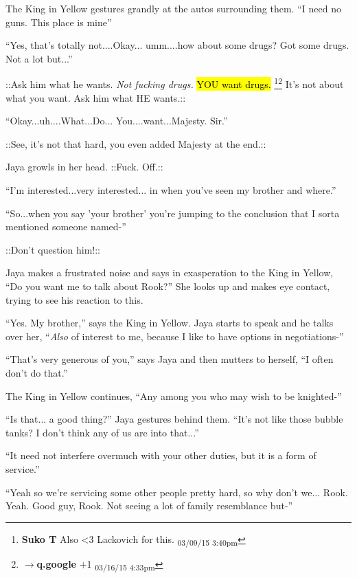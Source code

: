 The King in Yellow gestures grandly at the autos surrounding them.  ``I need no guns.  This place is mine''

``Yes, that's totally not....Okay... umm....how about some drugs?  Got some drugs.  Not a lot but...''

 {\color[RGB]{74,134,232}::Ask him what he wants.  } \textit{ {\color[RGB]{74,134,232}Not fucking drugs.} } {\color[RGB]{74,134,232}  }  {\color[RGB]{74,134,232}\hl{YOU want drugs.}} \footnote{\textbf{Suko T }Also \textless 3 Lackovich for this. \textsubscript{03/09/15 3:40pm}}\footnote{$\rightarrow$\textbf{q.google }+1 \textsubscript{03/16/15 4:33pm}} {\color[RGB]{74,134,232} It's not about what you want.  Ask him what HE wants.::} 

``Okay...uh....What...Do... You....want...Majesty.  Sir.''

 {\color[RGB]{74,134,232}::See, it's not that hard, you even added Majesty at the end.::} 

Jaya growls in her head.  {\color[RGB]{255,0,0}::Fuck.  Off.::} 

``I'm interested...very interested... in when you've seen my brother and where.''

``So...when you say 'your brother' you're jumping to the conclusion that I sorta mentioned someone named-''

 {\color[RGB]{74,134,232}::Don't question him!::} 

Jaya makes a frustrated noise and says in exasperation to the King in Yellow, ``Do you want me to talk about Rook?''  She looks up and makes eye contact, trying to see his reaction to this.

``Yes.   My brother,'' says the King in Yellow.  Jaya starts to speak and he talks over her, ``\textit{Also} of interest to me, because I like to have options in negotiations-''

``That's very generous of you,'' says Jaya and then mutters to herself, ``I often don't do that.''

The King in Yellow continues, ``Any among you who may wish to be knighted-''

``Is that... a good thing?'' Jaya gestures behind them.  ``It's not like those bubble tanks?  I don't think any of us are into that...''

``It need not interfere overmuch with your other duties, but it is a form of service.''

``Yeah so we're servicing some other people pretty hard, so why don't we... Rook.  Yeah. Good guy, Rook.  Not seeing a lot of family resemblance but-''

